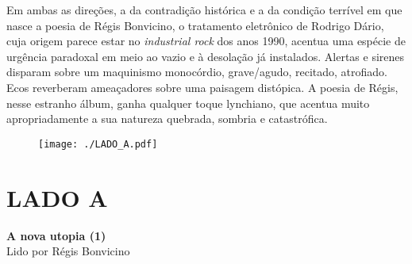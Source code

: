 Em ambas as direções, a da contradição histórica e a da condição
terrível em que nasce a poesia de Régis Bonvicino, o tratamento
eletrônico de Rodrigo Dário, cuja origem parece estar no
\emph{industrial rock} dos anos 1990, acentua uma espécie de urgência
paradoxal em meio ao vazio e à desolação já instalados. Alertas e
sirenes disparam sobre um maquinismo monocórdio, grave/agudo, recitado,
atrofiado. Ecos reverberam ameaçadores sobre uma paisagem distópica. A
poesia de Régis, nesse estranho álbum, ganha qualquer toque lynchiano,
que acentua muito apropriadamente a sua natureza quebrada, sombria e
catastrófica.

\pagebreak
\thispagestyle{empty}

\begin{absolutelynopagebreak}

\begin{vplace}
\begin{figure}[H]
\begin{adjustwidth}{-3cm}{}
  \vspace*{14.7cm}
  \texttt{[image: ./LADO\_A.pdf]}  
\end{adjustwidth}

\end{figure}
\end{vplace}

\end{absolutelynopagebreak}

\chapter*{LADO A}
\textbf{A nova utopia (1)}\\
Lido por Régis Bonvicino

\bigskip

